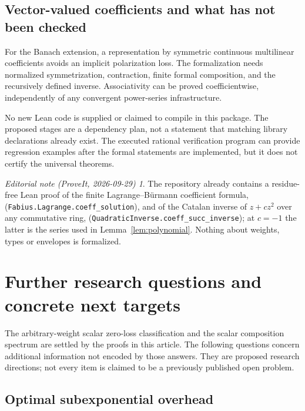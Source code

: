 \documentclass[11pt,a4paper]{article}
\numberwithin{equation}{section}
\theoremstyle{definition}
\theoremstyle{remark}
\newtheorem*{ednote}{Editorial note (ProveIt, 2026-09-29)}
\begin{document}
\subsection{Vector-valued coefficients and what has not been checked}

For the Banach extension, a representation by symmetric continuous
multilinear coefficients avoids an implicit polarization loss. The
formalization needs normalized symmetrization, contraction, finite formal
composition, and the recursively defined inverse. Associativity can be
proved coefficientwise, independently of any convergent power-series
infrastructure.

No new Lean code is supplied or claimed to compile in this package.
The proposed stages are a dependency plan, not a statement that matching
library declarations already exist. The executed rational verification
program can provide regression examples after the formal statements are
implemented, but it does not certify the universal theorems.
\begin{ednote}
The repository already contains a residue-free Lean proof of the finite
Lagrange--B\"urmann coefficient formula,
(\texttt{Fabius.Lagrange.coeff\_solution}), and of the Catalan inverse of
$z+cz^2$ over any commutative ring,
(\texttt{QuadraticInverse.coeff\_succ\_inverse}); at $c=-1$ the latter is
the series used in Lemma~\ref{lem:polynomial}. Nothing about weights, types
or envelopes is formalized.
\end{ednote}

\section{Further research questions and concrete next targets}
\label{sec:questions}

The arbitrary-weight scalar zero-loss classification and the scalar
composition spectrum are settled by the proofs in this article. The
following questions concern additional information not encoded by those
answers. They are proposed research directions; not every item is
claimed to be a previously published open problem.

\subsection{Optimal subexponential overhead}
\end{document}
